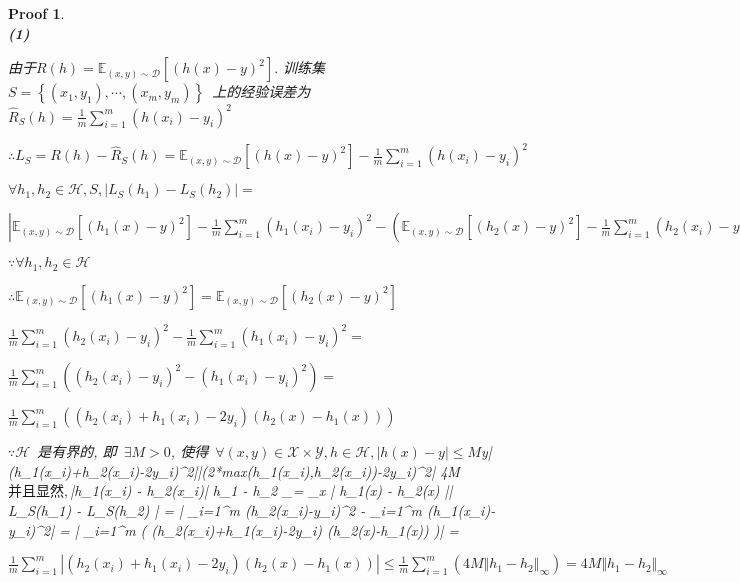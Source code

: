 \documentclass[a4paper,UTF8]{article}
\numberwithin{equation}{section}
\newtheorem*{myProof}{Proof}
\begin{document}
	\begin{myProof}~\\ 
		
		\textbf{(1)}
		
		由于$R(h) = \mathbb{E}_{(x,y) \sim \mathcal{D}} \left[ (h(x)-y)^2 \right] . $
		训练集~$S = \left\{ (x_1,y_1) , \cdots , (x_m,y_m) \right\}$~上的经验误差为$\hat{R}_S(h) = \frac{1}{m} \sum_{i=1}^m (h(x_i)-y_i)^2$
		
		$\therefore L_S = R(h) - \hat{R}_S(h) = \mathbb{E}_{(x,y) \sim \mathcal{D}} \left[ (h(x)-y)^2 \right] - \frac{1}{m} \sum_{i=1}^m (h(x_i)-y_i)^2$ 
		
		$\forall h_1 , h_2 \in \mathcal{H} , S , \left| L_S(h_1) - L_S(h_2) \right| = $
		
		$\left| \mathbb{E}_{(x,y) \sim \mathcal{D}} \left[ (h_1(x)-y)^2 \right] - \frac{1}{m} \sum_{i=1}^m (h_1(x_i)-y_i)^2 - \left( \mathbb{E}_{(x,y) \sim \mathcal{D}} \left[ (h_2(x)-y)^2 \right] - \frac{1}{m} \sum_{i=1}^m (h_2(x_i)-y_i)^2 \right) \right|$
		
		$\because \forall h_1 , h_2 \in \mathcal{H}$
		
		$\therefore \mathbb{E}_{(x,y) \sim \mathcal{D}} \left[ (h_1(x)-y)^2 \right] = \mathbb{E}_{(x,y) \sim \mathcal{D}} \left[ (h_2(x)-y)^2 \right]$
		
		$\frac{1}{m} \sum_{i=1}^m (h_2(x_i)-y_i)^2 - \frac{1}{m} \sum_{i=1}^m (h_1(x_i)-y_i)^2 = $
		
		$\frac{1}{m} \sum_{i=1}^m \left ( (h_2(x_i)-y_i)^2 - (h_1(x_i)-y_i)^2 \right )  = $
		
		
		$\frac{1}{m} \sum_{i=1}^m \left ( (h_2(x_i)+h_1(x_i)-2y_i) (h_2(x)-h_1(x)) \right ) $
		
		$\because \mathcal{H}$~是有界的, 即~$\exists M>0$, 使得~$ \forall (x,y) \in \mathcal{X} \times \mathcal{Y} , h \in \mathcal{H} , | h(x) - y | \leqslant M $y$
		
		$\therefore |(h_1(x_i)+h_2(x_i)-2y_i)^2|\leq |(2*max(h_1(x_i),h_2(x_i))-2y_i)^2| \leq 4M$
		
		并且显然,$|h_1(x_i) - h_2(x_i)| \leq \Vert h_1 - h_2 \Vert_\infty = \max_{x \in {}} | h_1(x) - h_2(x) |$
		
		$\therefore \left| L_S(h_1) - L_S(h_2) \right| = | \sum_{i=1}^m (h_2(x_i)-y_i)^2 -  \sum_{i=1}^m (h_1(x_i)-y_i)^2| = $
		
		$| \sum_{i=1}^m \left ( (h_2(x_i)+h_1(x_i)-2y_i) (h_2(x)-h_1(x)) \right )| =
		
		$\frac{1}{m} \sum_{i=1}^m |  (h_2(x_i)+h_1(x_i)-2y_i) (h_2(x)-h_1(x)) | \leq \frac{1}{m} \sum_{i=1}^m (4M  \Vert h_1 - h_2 \Vert_\infty )=4M  \Vert h_1 - h_2 \Vert_\infty$
		

\end{myProof}
\end{document}
